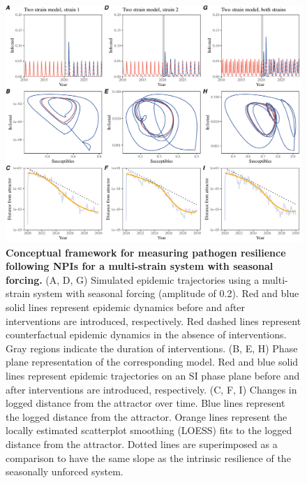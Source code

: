 \documentclass[12pt]{article}
\begin{document}
\begin{figure}[!th]
\includegraphics[width=\textwidth]{../figure2/figure2_multi.pdf}
\caption{
\textbf{Conceptual framework for measuring pathogen resilience following NPIs for a multi-strain system with seasonal forcing.}
(A, D, G) Simulated epidemic trajectories using a multi-strain system with seasonal forcing (amplitude of 0.2).
Red and blue solid lines represent epidemic dynamics before and after interventions are introduced, respectively.
Red dashed lines represent counterfactual epidemic dynamics in the absence of interventions.
Gray regions indicate the duration of interventions.
(B, E, H) Phase plane representation of the corresponding model.
Red and blue solid lines represent epidemic trajectories on an SI phase plane before and after interventions are introduced, respectively.
(C, F, I) Changes in logged distance from the attractor over time.
Blue lines represent the logged distance from the attractor.
Orange lines represent the locally estimated scatterplot smoothing (LOESS) fits to the logged distance from the attractor.
Dotted lines are superimposed as a comparison to have the same slope as the intrinsic resilience of the seasonally unforced system.
}
\end{figure}

\pagebreak
\end{document}
